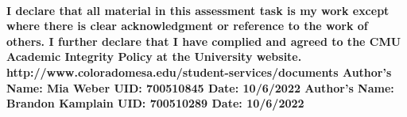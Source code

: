 \documentclass{article}
\begin{document}
\paragraph{\linebreak I declare that all material in this assessment task is my work except where there is clear acknowledgment or reference to the work of others. I further declare that I have complied and agreed to the CMU Academic Integrity Policy at the University website.
\linebreak  http://www.coloradomesa.edu/student-services/documents
\linebreak \linebreak Author’s Name: Mia Weber UID: 700510845 Date: 10/6/2022
\linebreak Author's Name: Brandon Kamplain UID: 700510289 Date: 10/6/2022}
\end{document}
